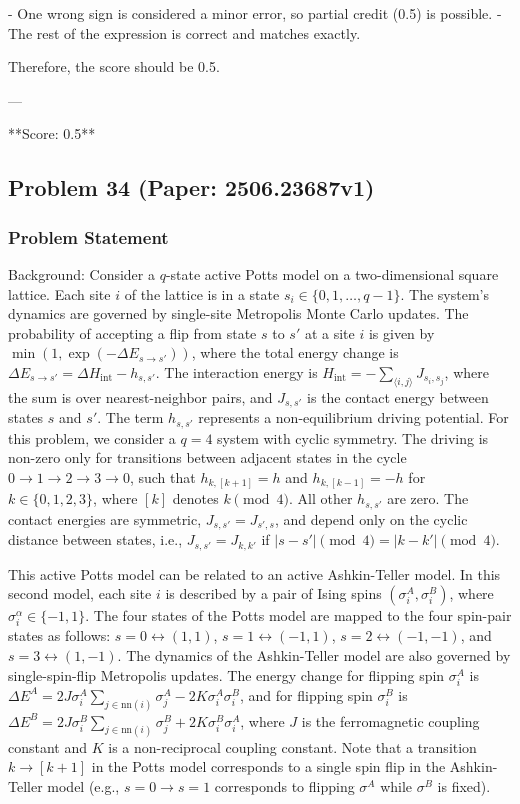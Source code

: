 \documentclass[10pt]{article}
\begin{document}
- One wrong sign is considered a minor error, so partial credit (0.5) is possible.
- The rest of the expression is correct and matches exactly.

Therefore, the score should be 0.5.

---

**Score: 0.5**

\newpage
\subsection*{Problem 34 (Paper: 2506.23687v1)}
\subsubsection*{Problem Statement}
Background:
Consider a $q$-state active Potts model on a two-dimensional square lattice. Each site $i$ of the lattice is in a state $s_i \in \{0, 1, \dots, q-1\}$. The system's dynamics are governed by single-site Metropolis Monte Carlo updates. The probability of accepting a flip from state $s$ to $s'$ at a site $i$ is given by $\min(1, \exp(-\Delta E_{s \to s'}))$, where the total energy change is $\Delta E_{s \to s'} = \Delta H_{\mathrm{int}} - h_{s,s'}$. The interaction energy is $H_{\mathrm{int}} = - \sum_{\langle i,j \rangle} J_{s_i, s_j}$, where the sum is over nearest-neighbor pairs, and $J_{s,s'}$ is the contact energy between states $s$ and $s'$. The term $h_{s,s'}$ represents a non-equilibrium driving potential. For this problem, we consider a $q=4$ system with cyclic symmetry. The driving is non-zero only for transitions between adjacent states in the cycle $0 \to 1 \to 2 \to 3 \to 0$, such that $h_{k, [k+1]} = h$ and $h_{k, [k-1]} = -h$ for $k \in \{0,1,2,3\}$, where $[k]$ denotes $k \pmod 4$. All other $h_{s,s'}$ are zero. The contact energies are symmetric, $J_{s,s'} = J_{s',s}$, and depend only on the cyclic distance between states, i.e., $J_{s,s'} = J_{k,k'}$ if $|s-s'| \pmod 4 = |k-k'| \pmod 4$.

This active Potts model can be related to an active Ashkin-Teller model. In this second model, each site $i$ is described by a pair of Ising spins $(\sigma_i^A, \sigma_i^B)$, where $\sigma_i^\alpha \in \{-1, 1\}$. The four states of the Potts model are mapped to the four spin-pair states as follows: $s=0 \leftrightarrow (1,1)$, $s=1 \leftrightarrow (-1,1)$, $s=2 \leftrightarrow (-1,-1)$, and $s=3 \leftrightarrow (1,-1)$. The dynamics of the Ashkin-Teller model are also governed by single-spin-flip Metropolis updates. The energy change for flipping spin $\sigma_i^A$ is $\Delta E^A = 2J\sigma_i^A \sum_{j \in \text{nn}(i)} \sigma_j^A - 2K \sigma_i^A \sigma_i^B$, and for flipping spin $\sigma_i^B$ is $\Delta E^B = 2J\sigma_i^B \sum_{j \in \text{nn}(i)} \sigma_j^B + 2K \sigma_i^B \sigma_i^A$, where $J$ is the ferromagnetic coupling constant and $K$ is a non-reciprocal coupling constant. Note that a transition $k \to [k+1]$ in the Potts model corresponds to a single spin flip in the Ashkin-Teller model (e.g., $s=0 \to s=1$ corresponds to flipping $\sigma^A$ while $\sigma^B$ is fixed).
\end{document}
